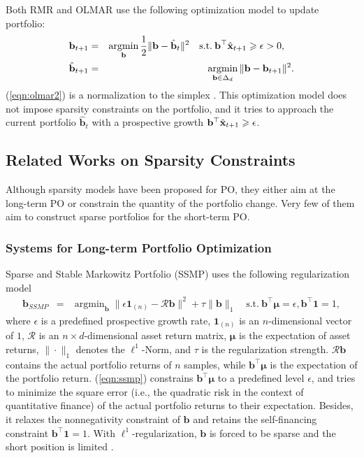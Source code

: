 \documentclass[twoside,11pt]{article}
\DeclareMathOperator*{\argmin}{argmin}
\begin{document}
Both RMR and OLMAR use the following optimization model to update portfolio:
\begin{eqnarray}
\label{eqn:olmar}
\mathbf{b}_{t+1}&=&\argmin_{\mathbf{b}}\frac{1}{2}\|\mathbf{b}-\hat{\mathbf{b}}_t\|^2\quad \text{s.t.} \:\mathbf{b}^\top \hat{\mathbf{x}}_{t+1}\geqs \epsilon>0,\quad\\
\label{eqn:olmar2}
\hat{\mathbf{b}}_{t+1}&=&\argmin_{\mathbf{b} \in \Delta_d} \|\mathbf{b}-\mathbf{b}_{t+1}\|^2.
\end{eqnarray}
(\ref{eqn:olmar2}) is a normalization to the simplex \citep{simplexproject}. This optimization model does not impose sparsity constraints on the portfolio, and it tries to approach the current portfolio $\hat{\mathbf{b}}_t$ with a prospective growth $\mathbf{b}^\top \hat{\mathbf{x}}_{t+1}\geqslant \epsilon$.


\subsection{Related Works on Sparsity Constraints}
\label{sec:relateworksparse}
Although sparsity models have been proposed for PO, they either aim at the long-term PO or constrain the quantity of the portfolio change. Very few of them aim to construct sparse portfolios for the short-term PO. 

\subsubsection{Systems for Long-term Portfolio Optimization}
\label{sec:longsystem}
Sparse and Stable Markowitz Portfolio (SSMP) \citep{sparsepo} uses the following regularization model
\begin{eqnarray}
\label{eqn:ssmp}
\mathbf{b}_{SSMP}&=&\argmin_{\mathbf{b}}\| \epsilon \mathbf{1}_{(n)}-  \mathcal{R}\mathbf{b}\|^2+ \tau\| \mathbf{b} \|_1 \quad \text{s.t.} \: \mathbf{b}^\top \bm{\mu}=\epsilon, \mathbf{b}^\top\mathbf{1}=1,
\end{eqnarray}
where $\epsilon$ is a predefined prospective growth rate, $\mathbf{1}_{(n)}$ is an $n$-dimensional vector of $1$, $\mathcal{R}$ is an $n\times d$-dimensional asset return matrix, $\bm{\mu}$ is the expectation of asset returns, $\| \cdot\|_1$ denotes the $\ell^1$-Norm, and $\tau$ is the regularization strength. $\mathcal{R}\mathbf{b}$ contains the actual portfolio returns of $n$ samples, while $\mathbf{b}^\top \bm{\mu}$ is the expectation of the portfolio return. (\ref{eqn:ssmp}) constrains $\mathbf{b}^\top \bm{\mu}$ to a predefined level $\epsilon$, and tries to minimize the square error (i.e., the quadratic risk in the context of quantitative finance) of the actual portfolio returns to their expectation. Besides, it relaxes the nonnegativity constraint of $\mathbf{b}$ and retains the self-financing constraint $\mathbf{b}^\top\mathbf{1}=1$. With $\ell^1$-regularization, $\mathbf{b}$ is forced to be sparse and the short position is limited \citep{sparsepo}.
\end{document}
